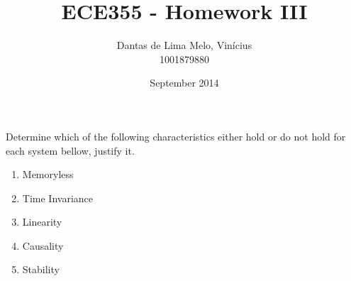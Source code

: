 \documentclass{article}
\title{ECE355 - Homework III}
\author{Dantas de Lima Melo, Vinícius \\ \small{1001879880}}
\date{September 2014}
\begin{document}
\maketitle

\section{}
\setcounter{subsection}{26}
\subsection{} Determine which of the following characteristics either hold or do not hold for each system bellow, justify it.
\begin{enumerate}
    \item Memoryless
    \item Time Invariance
    \item Linearity
    \item Causality
    \item Stability
\end{enumerate}
\end{document}
